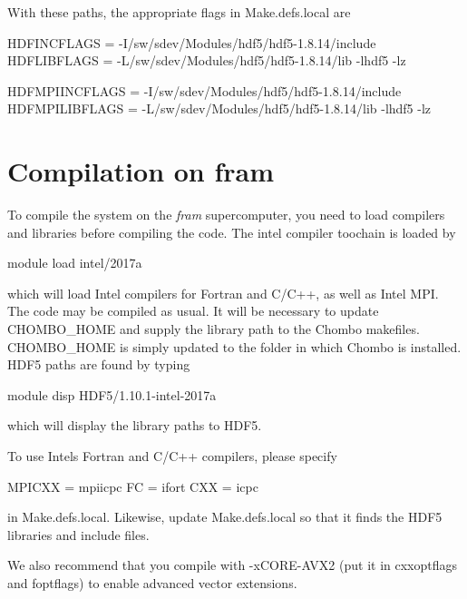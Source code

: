 With these paths, the appropriate flags in Make.\+defs.\+local are \begin{DoxyVerb}HDFINCFLAGS    = -I/sw/sdev/Modules/hdf5/hdf5-1.8.14/include 
HDFLIBFLAGS    = -L/sw/sdev/Modules/hdf5/hdf5-1.8.14/lib -lhdf5 -lz 

HDFMPIINCFLAGS = -I/sw/sdev/Modules/hdf5/hdf5-1.8.14/include 
HDFMPILIBFLAGS = -L/sw/sdev/Modules/hdf5/hdf5-1.8.14/lib -lhdf5 -lz
\end{DoxyVerb}


\section*{Compilation on fram }

To compile the system on the {\itshape fram} supercomputer, you need to load compilers and libraries before compiling the code. The intel compiler toochain is loaded by \begin{DoxyVerb}module load intel/2017a
\end{DoxyVerb}


which will load Intel compilers for Fortran and C/\+C++, as well as Intel M\+PI. The code may be compiled as usual. It will be necessary to update C\+H\+O\+M\+B\+O\+\_\+\+H\+O\+ME and supply the library path to the Chombo makefiles. C\+H\+O\+M\+B\+O\+\_\+\+H\+O\+ME is simply updated to the folder in which Chombo is installed. H\+D\+F5 paths are found by typing \begin{DoxyVerb}module disp HDF5/1.10.1-intel-2017a
\end{DoxyVerb}


which will display the library paths to H\+D\+F5.

To use Intel\textquotesingle{}s Fortran and C/\+C++ compilers, please specify \begin{DoxyVerb} MPICXX = mpiicpc
 FC     = ifort
 CXX    = icpc
\end{DoxyVerb}


in Make.\+defs.\+local. Likewise, update Make.\+defs.\+local so that it finds the H\+D\+F5 libraries and include files.

We also recommend that you compile with -\/x\+C\+O\+R\+E-\/\+A\+V\+X2 (put it in cxxoptflags and foptflags) to enable advanced vector extensions. 